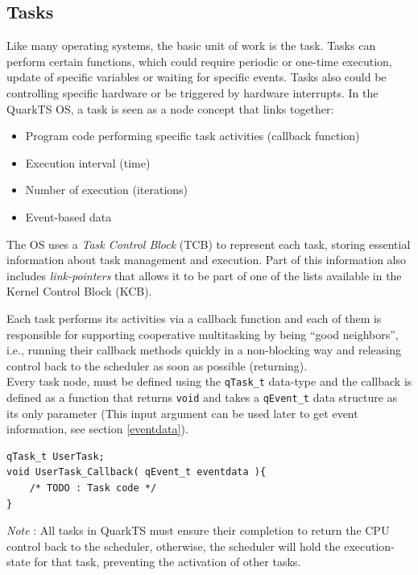 \documentclass{article}
\begin{document}
\subsection{Tasks}
Like many operating systems, the basic unit of work is the task. Tasks can perform certain functions, which could require periodic or one-time execution, update of specific variables or waiting for specific events. Tasks also could be controlling specific hardware or be triggered by hardware interrupts. In the QuarkTS OS, a task is seen as a node concept that links together:

\begin{itemize}
    \item Program code performing specific task activities (callback function)
    \item Execution interval (time)
    \item Number of execution (iterations)
    \item Event-based data
\end{itemize}

The OS  uses a \textit{Task Control Block} (TCB) to represent each task, storing essential information about task management and execution. Part of this information also includes \textit{link-pointers} that allows it to be part of one of the lists available in the Kernel Control Block (KCB).



Each task performs its activities via a callback function and each of them is responsible for supporting cooperative multitasking by being “good neighbors”, i.e., running their callback methods quickly in a non-blocking way and releasing control back to the scheduler as soon as possible (returning). \\

Every task node, must be defined using the \lstinline{qTask_t}  data-type and the callback is defined as a function that returns \lstinline{void} and takes a \lstinline{qEvent_t} data structure as its only parameter (This input argument can be used later to get event information, see section \ref{eventdata}).\\

\begin{lstlisting}[style=CStyle]
qTask_t UserTask;
void UserTask_Callback( qEvent_t eventdata ){
    /* TODO : Task code */
}
\end{lstlisting}

\begin{tcolorbox}
\ArrowBoldDownRight \textit{Note} : All tasks in QuarkTS must ensure their completion to return the CPU control back to the scheduler, otherwise, the scheduler will hold the execution-state for that task, preventing the activation of other tasks.
\end{tcolorbox}
\end{document}
